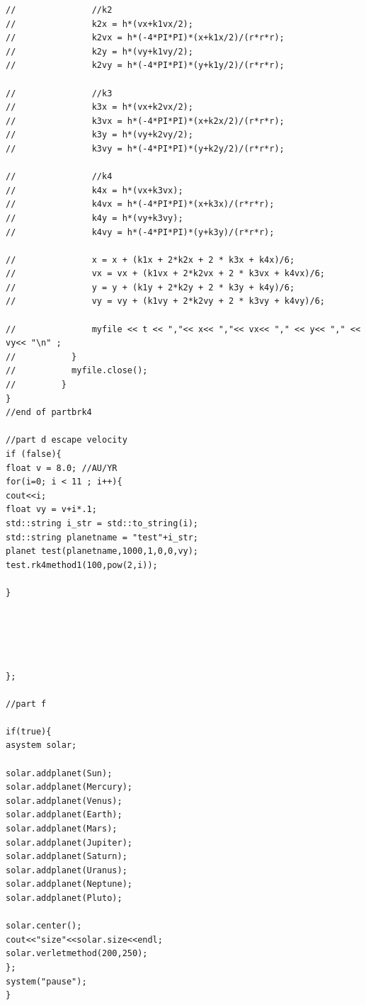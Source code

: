 \documentclass[11pt]{article}
\begin{document}
\begin{verbatim}
//               //k2
//               k2x = h*(vx+k1vx/2);
//               k2vx = h*(-4*PI*PI)*(x+k1x/2)/(r*r*r);
//               k2y = h*(vy+k1vy/2);
//               k2vy = h*(-4*PI*PI)*(y+k1y/2)/(r*r*r);

//               //k3
//               k3x = h*(vx+k2vx/2);
//               k3vx = h*(-4*PI*PI)*(x+k2x/2)/(r*r*r);
//               k3y = h*(vy+k2vy/2);
//               k3vy = h*(-4*PI*PI)*(y+k2y/2)/(r*r*r);

//               //k4
//               k4x = h*(vx+k3vx);
//               k4vx = h*(-4*PI*PI)*(x+k3x)/(r*r*r);
//               k4y = h*(vy+k3vy);
//               k4vy = h*(-4*PI*PI)*(y+k3y)/(r*r*r);

//               x = x + (k1x + 2*k2x + 2 * k3x + k4x)/6;
//               vx = vx + (k1vx + 2*k2vx + 2 * k3vx + k4vx)/6;
//               y = y + (k1y + 2*k2y + 2 * k3y + k4y)/6;
//               vy = vy + (k1vy + 2*k2vy + 2 * k3vy + k4vy)/6;

//               myfile << t << ","<< x<< ","<< vx<< "," << y<< "," << vy<< "\n" ;
//           }
//           myfile.close();
//         }
}
//end of partbrk4

//part d escape velocity
if (false){
float v = 8.0; //AU/YR
for(i=0; i < 11 ; i++){
cout<<i;
float vy = v+i*.1;
std::string i_str = std::to_string(i);
std::string planetname = "test"+i_str;
planet test(planetname,1000,1,0,0,vy);
test.rk4method1(100,pow(2,i));

}





};

//part f

if(true){
asystem solar;

solar.addplanet(Sun);
solar.addplanet(Mercury);
solar.addplanet(Venus);
solar.addplanet(Earth);
solar.addplanet(Mars);
solar.addplanet(Jupiter);
solar.addplanet(Saturn);
solar.addplanet(Uranus);
solar.addplanet(Neptune);
solar.addplanet(Pluto);

solar.center();
cout<<"size"<<solar.size<<endl;
solar.verletmethod(200,250);
};
system("pause");
}

\end{verbatim}
\end{document}
